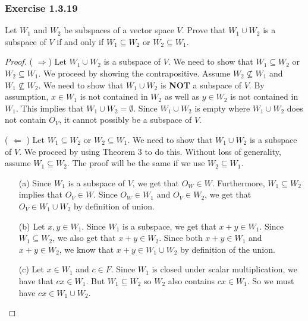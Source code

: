 \subsubsection{Exercise 1.3.19} Let \( W_{1}  \) and \( W_{2}  \) be subspaces of a vector space \( V  \). Prove that \( W_{1} \cup W_{2}  \) is a subspace of \( V  \) if and only if \( W_{1} \subseteq W_{2}  \) or \(  W_{2} \subseteq W_{1}  \).
\begin{proof}
    ( \( \Rightarrow \)) Let \( W_{1} \cup W_{2}  \) is a subspace of \( V  \). We need to show that \( W_{1} \subseteq W_{2}  \) or \( W_{2} \subseteq W_{1}  \). We proceed by showing the contrapositive. Assume \( W_{2} \not\subseteq W_{1}  \) and \( W_{1} \not\subseteq W_{2}   \). We need to show that \( W_{1} \cup W_{2}  \) is \textbf{NOT} a subspace of \( V  \).  By assumption, \( x \in W_{1}  \) is not contained in \( W_{2}  \) as well as \( y \in W_{2}  \) is not contained in \( W_{1} \). This implies that \( W_{1} \cup W_{2} = \emptyset \). Since \( W_{1} \cup W_{2}  \) is empty where \( W_{1} \cup W_{2}  \) does not contain \( O_{V} \), it cannot possibly be a subspace of \( V  \).

    ( \(\Leftarrow \) ) Let \( W_{1} \subseteq W_{2}  \) or \( W_{2} \subseteq W_{1}  \). We need to show that \( W_{1} \cup W_{2}  \) is a subspace of \( V  \). We proceed by using Theorem 3 to do this. Without loss of generality, assume \( W_{1} \subseteq W_{2}  \). The proof will be the same if we use \( W_{2} \subseteq W_{1} \).
    \begin{enumerate}
        \item[(a)] Since \( W_{1}  \) is a subspace of \( V \), we get that \( O_{W} \in W   \). Furthermore, \( W_{1} \subseteq W_{2}  \) implies that \( O_{V} \in W  \). Since \( O_{W} \in W_{1}  \) and \( O_{V} \in W_{2} \), we get that \( O_{V} \in W_{1} \cup W_{2}  \) by definition of union.
        \item[(b)] Let \( x,y \in W_{1}  \). Since \( W_{1}  \) is a subspace, we get that \( x + y \in W_{1}  \). Since \( W_{1} \subseteq W_{2}  \), we also get that \( x + y \in W_{2} \).
            Since both \( x + y \in W_{1}   \)  and \( x+y \in W_{2}  \), we know that \( x+ y \in W_{1} \cup W_{2}  \) by definition of the union.
        \item[(c)] Let \( x \in W_{1}   \) and \( c \in F  \). Since \( W_{1}  \) is closed under scalar multiplication, we have that \( cx \in W_{1}  \). But \( W_{1} \subseteq W_{2}  \) so \( W_{2}  \) also contains \( cx \in W_{1} \). So we must have \( cx \in W_{1} \cup W_{2} \).
    \end{enumerate}
\end{proof}

